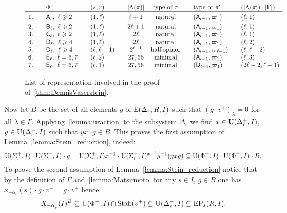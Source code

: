 \begin{figure}
\[\begin{array}{l @{\qquad} l @{\qquad} l @{\qquad} c @{\quad} c @{\qquad} l @{\qquad} l}
   & \Phi                                 & (s,r)         & |\Lambda(\pi)| & \text{type of $\pi$} & \text{type of $\pi'$}        & (|\Lambda(\pi')|, |\Gamma|)  \\ \hline\vphantom{\Bigl(}
1. & \rA_\ell,\ \ell\geqslant 2           & (1,\ell)      & \ell+1         & \text{natural}       & (\rA_{l-1}, \varpi_1)        & (\ell,1)  \\     
2. & \rB_\ell,\ \ell\geqslant 2           & (1,\ell)      & 2\ell+1        & \text{natural}       & (\rA_{l-1}, \varpi_1)        & (\ell,1) \\     
3. & \rC_\ell,\ \ell\geqslant 2           & (1,\ell)      & 2\ell          & \text{natural}       & (\rA_{l-1}, \varpi_1)        & (\ell,1)  \\
4. & \rD_\ell,\ \ell\geqslant 4           & (1,\ell)      & 2\ell          & \text{natural}       & (\rA_{l-1}, \varpi_1)        & (\ell,2)  \\ 
5. & \rD_\ell,\ \ell\geqslant 4           & (\ell,\ell-1) & 2^{\ell-1}     & \text{half-spinor}   & (\rA_{l-1}, \varpi_{\ell-1}) & (\ell,\ell-2)  \\
6. & \rE_\ell,\ \ell=6,7                  & (\ell,2)      & 27, 56         & \text{minimal}       & (\rA_{l-1}, \varpi_1)        & (\ell,3)  \\ 
7. & \rE_\ell,\ \ell=6,7                  & (\ell,1)      & 27, 56         & \text{minimal}       & (\rD_{l-1}, \varpi_1)        & (2\ell-2,\ell-1)  \end{array}\]
 \caption[Table]{List of representation involved in the proof of~\cref{thm:DennisVaserstein}.} \label{fig:table}
\end{figure}

Now let $B$ be the set of all elements $g$ of $\operatorname{E}(\Delta_r,R, I)$ such that $(g \cdot v^+)_\lambda = 0$ for all $\lambda\in\Gamma$.
Applying~\cref{lemma:uraction} to the subsystem $\Delta_r$ we find
$x\in\operatorname{U}(\Delta_r^+, I)$, $y\in \operatorname{U}(\Delta_r^-, I)$ such that $yx\cdot g \in B$.
This proves the first assumption of Lemma~\ref{lemma:Stein_reduction}, indeed:
\[ \operatorname{U}(\Sigma^+_r, I) \cdot \operatorname{U}(\Sigma^-_r, I) \cdot g = \operatorname{U}(\Sigma^+_r, I) x^{-1} \cdot \operatorname{U}(\Sigma^-_r, I)^{x^{-1}} y^{-1} (yxg) \subseteq \operatorname{U}(\Phi^+, I) \cdot \operatorname{U}(\Phi^-, I) \cdot B. \]
To prove the second assumption of Lemma~\ref{lemma:Stein_reduction} notice that by the definition of $\Gamma$ and~\cref{lemma:Matsumoto} for any $s\in I$, $ g\in B$ one has $x_{-\alpha_r}(s) \cdot g \cdot v^+ = g \cdot v^+$ hence
\[ X_{-\alpha\ssub{r}}(I)^{B} \subseteq \U(\Phi^-, I) \cap \Stab(v^+) \subseteq \U(\Delta_s^-, I) \subseteq \EP_s(R, I). \]

